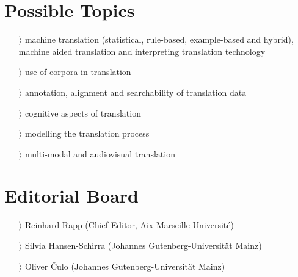 \documentclass[
notumble,
nofoldmark,
]{leaflet}
\begin{document}
 
{
    \color{LIGHTGRAY}
    \section{Possible Topics} 
 
\raggedright
\begin{itemize}
 \item [$\rangle$]machine translation (statistical, rule-based, example-based and hybrid), machine aided translation and interpreting
translation technology\item [$\rangle$]
use of corpora in translation\item [$\rangle$]
annotation, alignment and searchability of translation data\item [$\rangle$]
cognitive aspects of translation\item [$\rangle$]
modelling the translation process\item [$\rangle$]
multi-modal and audiovisual translation 
\end{itemize}



    \section{Editorial Board}    

    \begin{itemize}
    \item[$\rangle$] Reinhard Rapp (Chief Editor, Aix-Marseille Universit\'e)
    \item[$\rangle$] Silvia Hansen-Schirra (Johannes Gutenberg-Universit\"at Mainz)
    \item[$\rangle$] Oliver \v{C}ulo (Johannes Gutenberg-Universit\"at Mainz)
    \end{itemize} 
}
\end{document}

